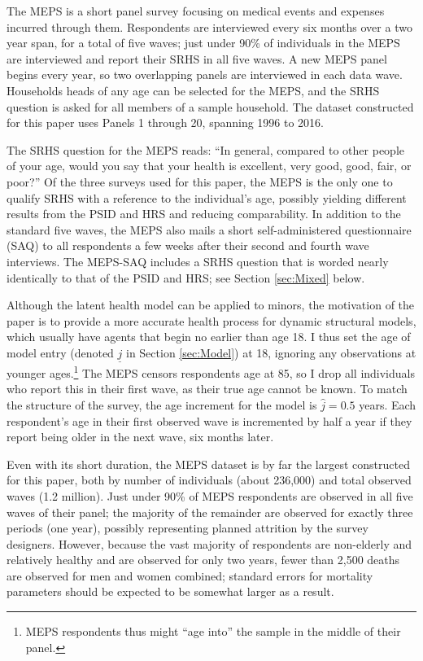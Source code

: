 \documentclass[12pt,pdftex,letterpaper]{article}
\newcommand{\Age}{j}
\newcommand{\AgeMin}{\underline{\Age}}
\newcommand{\AgeIncr}{\hat{\Age}}
\begin{document}
The MEPS is a short panel survey focusing on medical events and expenses incurred through them.  Respondents are interviewed every six months over a two year span, for a total of five waves; just under 90\% of individuals in the MEPS are interviewed and report their SRHS in all five waves.  A new MEPS panel begins every year, so two overlapping panels are interviewed in each data wave.  Households heads of any age can be selected for the MEPS, and the SRHS question is asked for all members of a sample household.  The dataset constructed for this paper uses Panels 1 through 20, spanning 1996 to 2016.

The SRHS question for the MEPS reads: ``In general, compared to other people of your age, would you say that your health is excellent, very good, good, fair, or poor?''  Of the three surveys used for this paper, the MEPS is the only one to qualify SRHS with a reference to the individual's age, possibly yielding different results from the PSID and HRS and reducing comparability.  In addition to the standard five waves, the MEPS also mails a short self-administered questionnaire (SAQ) to all respondents a few weeks after their second and fourth wave interviews.  The MEPS-SAQ includes a SRHS question that is worded nearly identically to that of the PSID and HRS; see Section \ref{sec:Mixed} below.

Although the latent health model can be applied to minors, the motivation of the paper is to provide a more accurate health process for dynamic structural models, which usually have agents that begin no earlier than age 18.  I thus set the age of model entry (denoted $\AgeMin$ in Section \ref{sec:Model}) at 18, ignoring any observations at younger ages.\footnote{MEPS respondents thus might ``age into'' the sample in the middle of their panel.}  The MEPS censors respondents age at 85, so I drop all individuals who report this in their first wave, as their true age cannot be known.  To match the structure of the survey, the age increment for the model is $\AgeIncr=0.5$ years.  Each respondent's age in their first observed wave is incremented by half a year if they report being older in the next wave, six months later.

Even with its short duration, the MEPS dataset is by far the largest constructed for this paper, both by number of individuals (about 236,000) and total observed waves (1.2 million).  Just under 90\% of MEPS respondents are observed in all five waves of their panel; the majority of the remainder are observed for exactly three periods (one year), possibly representing planned attrition by the survey designers.  However, because the vast majority of respondents are non-elderly and relatively healthy and are observed for only two years, fewer than 2,500 deaths are observed for men and women combined; standard errors for mortality parameters should be expected to be somewhat larger as a result.
\end{document}
